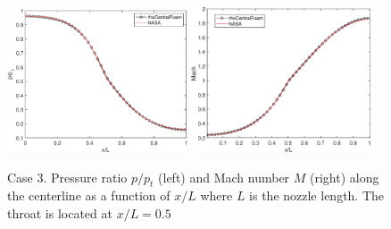 \documentclass[12pt]{article}
\begin{document}
\begin{figure}
\centering\includegraphics[width=0.475\textwidth]{case3_pratio}
\hfill
\centering\includegraphics[width=0.475\textwidth]{case3_M}
\caption{Case 3. Pressure ratio  $p/p_t$ (left) and Mach number $M$ (right) along the centerline as
a function of $x/L$ where $L$ is the nozzle length.
The throat is located at $x/L=0.5$}
\label{fig:case1_pics}
\end{figure}



%


%
\end{document}
